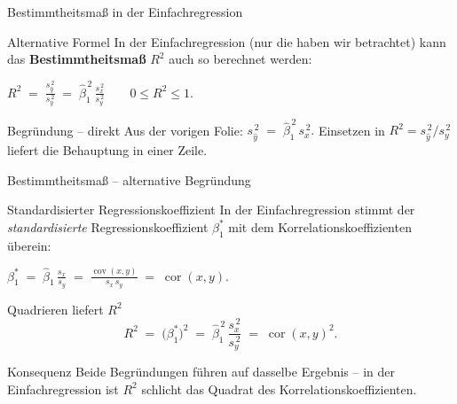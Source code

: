 \documentclass[aspectratio=169,11pt]{beamer}
\begin{document}
\begin{frame}{Bestimmtheitsmaß in der Einfachregression}
  \begin{block}{Alternative Formel}
    In der Einfachregression (nur die haben wir betrachtet) kann das
    \textbf{Bestimmtheitsmaß} $R^{2}$ auch so berechnet werden:
    \begin{center}
      $\displaystyle
        R^{2} \;=\; \frac{s_{\hat{y}}^{\,2}}{s_y^{\,2}}
              \;=\; \hat{\beta}_1^{\,2}\,\frac{s_x^{\,2}}{s_y^{\,2}}
        \qquad 0 \le R^{2} \le 1.$
    \end{center}
  \end{block}

  \begin{exampleblock}{Begründung -- direkt}
    Aus der vorigen Folie:
    \(
      s_{\hat{y}}^{\,2} \;=\; \hat{\beta}_1^{\,2}\, s_x^{\,2}.
    \)
    Einsetzen in $R^{2} = s_{\hat{y}}^{\,2}/s_y^{\,2}$ liefert die
    Behauptung in einer Zeile.
  \end{exampleblock}
\end{frame}

\begin{frame}{Bestimmtheitsmaß -- alternative Begründung}
  \begin{block}{Standardisierter Regressionskoeffizient}
    In der Einfachregression stimmt der \emph{standardisierte}
    Regressionskoeffizient $\beta_1^{\ast}$ mit dem
    Korrelationskoeffizienten überein:
    \begin{center}
      $\displaystyle
        \beta_1^{\ast} \;=\; \hat{\beta}_1\,\frac{s_x}{s_y}
        \;=\; \frac{\operatorname{cov}(x,y)}{s_x\,s_y}
        \;=\; \operatorname{cor}(x,y).$
    \end{center}
  \end{block}

  \begin{exampleblock}{Quadrieren liefert $R^{2}$}
    \[
      R^{2}
        \;=\; \bigl(\beta_1^{\ast}\bigr)^{2}
        \;=\; \hat{\beta}_1^{\,2}\,\frac{s_x^{\,2}}{s_y^{\,2}}
        \;=\; \operatorname{cor}(x,y)^{2}.
    \]
  \end{exampleblock}

  \begin{alertblock}{Konsequenz}
    Beide Begründungen führen auf dasselbe Ergebnis -- in der
    Einfachregression ist $R^{2}$ schlicht das Quadrat des
    Korrelations\-koeffizienten.
  \end{alertblock}
\end{frame}
\end{document}
